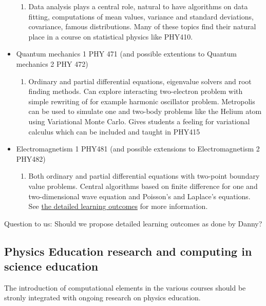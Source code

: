 \documentclass[%
oneside,                 %
final,                   %
10pt]{article}
\begin{document}
\begin{itemize}
\begin{enumerate}
  \item Data analysis plays a central role, natural to have algorithms on data fitting, computations  of mean values, variance and standard deviations, covariance, famous distributions. Many of these topics find their natural place in a course on statistical physics like PHY410.  

\end{enumerate}

\noindent
 \item Quantum mechanics 1  PHY 471 (and possible extentions to Quantum mechanics 2 PHY 472)
\begin{enumerate}

  \item Ordinary and partial differential equations, eigenvalue solvers and root finding methods. Can explore interacting two-electron problem with simple rewriting of for example harmonic oscillator problem. Metropolis can be used to simulate one and two-body problems like the Helium atom using Variational Monte Carlo. Gives students a feeling for variational calculus which can be included and  taught in PHY415

\end{enumerate}

\noindent
 \item Electromagnetism 1 PHY481 (and possible extensions to Electromagnetism 2 PHY482)
\begin{enumerate}

  \item Both ordinary and partial differential equations with two-point boundary value problems. Central algorithms based on finite difference for one and two-dimensional wave equation and Poisson's and Laplace's equations. See \href{{https://dannycab.github.io/phy481msu/learning_goals.html}}{the detailed learning outcomes} for more information.
\end{enumerate}

\noindent
\end{itemize}

\noindent
Question to us: Should we propose detailed learning outcomes as done by Danny? 




\subsection{Physics Education research and computing in science education}

The introduction of computational elements in the various courses should be stronly integrated with ongoing research on physics education.
\end{document}
